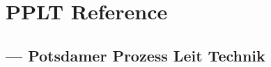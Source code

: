\chapter{PPLT Reference}
\section{ ---
        \textbf{P}otsdamer \textbf{P}rozess \textbf{L}eit \textbf{T}echnik}

